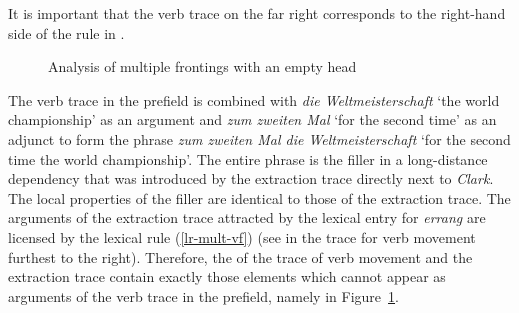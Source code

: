 It is important that the verb trace on the far right corresponds to the right-hand side of the rule
in . 
\begin{figure}
\resizebox{!}{\textheight-3\baselineskip}{%
\begin{sideways}
\begin{forest}
sm edges
[V{[\comps \eliste]}
	[V\ibox{5}\,{[\comps \sliste{ \ibox{1} }]}
		[PP
			[zum zweiten Mal;to.the second time, roof]]
		[V{[\comps \sliste{ \ibox{1} }]}
			[\ibox{2} NP{[\textit{acc}]}
				[die Weltmeisterschaft; the world championship, roof]]
			[V{[\comps \sliste{ \ibox{1}, \ibox{2} }]}
				[\trace]]]]
	[V\feattab{\comps \eliste,\\
                   \textsc{slash} \sliste{ \ibox{5} }}
		[V{[\comps \sliste{ \ibox{6} }]}
			[V{[\comps \ibox{3} $\oplus$ \sliste{ \ibox{4} }]}, tier=np,edge label={node[midway,right]{V1-LR}}
				[V{[\comps \sliste{ \ibox{1}, \ibox{2} }]}, tier=trace,edge label={node[midway,right]{MF-LR}}
					[errang;won]]]]
		[\ibox{6} V\feattab{\comps \eliste,\\
                                    \textsc{slash} \sliste{ \ibox{5} }}
			[\ibox{1} NP{[\textit{nom}]}, tier=np
				[Clark;Clark]]
			[V\feattab{\comps \ibox{3},\\
                                   \textsc{slash} \sliste{ \ibox{5} }}
				[\ibox{4}\feattab{\textsc{loc} \ibox{5} {[\comps \ibox{3}]},\\
                                                  \textsc{slash} \sliste{ \ibox{5} }}, tier=trace
					[\trace]]
				[V{[\comps \ibox{3} \sliste{ \ibox{1} } $\oplus$ \sliste{ \ibox{4} }]}
					[\trace]]]]]]
\end{forest}
\end{sideways}
}
\caption{\label{anal1}Analysis of multiple frontings with an empty head}
\end{figure}


The verb trace in the prefield is combined with \emph{die Weltmeisterschaft} `the world
championship' as an argument and \emph{zum zweiten Mal} `for the second time' as an adjunct to form
the phrase \emph{zum zweiten Mal die Weltmeisterschaft} `for the second time the world
championship'. The entire phrase is the filler in a long-distance dependency that was
introduced by the extraction trace directly next to \emph{Clark}. The local properties of the filler
 are identical to those of the extraction trace. The arguments of the extraction trace
attracted by the lexical entry for \emph{errang} are licensed by the lexical rule (\ref{lr-mult-vf})
(see  in the trace for verb movement furthest to the right). Therefore, the \compsl of the
trace of verb movement and the extraction trace contain exactly those elements which cannot appear
as arguments of the verb trace in the prefield, namely  in Figure~\ref{anal1}.

